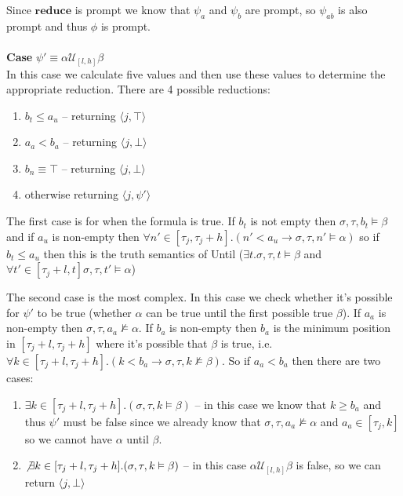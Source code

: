 \documentclass[10pt,a4paper]{article}
\newcommand{\rp}[2]{\ensuremath{\langle #1, #2 \rangle}}
\begin{document}
Since $\mathbf{reduce}$ is prompt we know that $\psi_a$ and $\psi_b$ are prompt, so $\psi_{ab}$ is also prompt and thus $\phi$ is prompt.
\\ \\ %
\noindent \textbf{Case} $\psi' \equiv \alpha \mathcal{U}_{[l,h]} \beta$ \\
In this case we calculate five values and then use these values to determine the appropriate reduction. There are 4 possible reductions:
\begin{enumerate}
\item $b_t \leq a_u$ -- returning $\rp{j}{\top}$
\item $a_a < b_a$ -- returning $\rp{j}{\bot}$
\item $b_n \equiv \top$ -- returning $\rp{j}{\bot}$
\item otherwise returning $\rp{j}{\psi'}$
\end{enumerate}

The first case is for when the formula is true. If $b_t$ is not empty then $\sigma, \tau, b_t \vDash \beta$ and 
if $a_u$ is non-empty then 
	$\forall n' \in [\tau_j,\tau_j+h].(n' < a_u \rightarrow \sigma, \tau, n' \vDash \alpha)$
	so if $b_t \leq a_u$ then this is the truth semantics of Until ($\exists t. \sigma, \tau, t \vDash \beta$ and $\forall t' \in [\tau_j+l,t] \sigma, \tau, t' \vDash \alpha$)

The second case is the most complex. In this case we check whether it's possible for $\psi'$ to be true (whether $\alpha$ can be true until the first possible true $\beta$).
If $a_a$ is non-empty then $\sigma, \tau, a_a \nvDash \alpha$. If $b_a$ is non-empty then $b_a$ is the minimum position in $[\tau_j+l,\tau_j+h]$ where it's possible that $\beta$ is true, i.e. $\forall k \in [\tau_j+l,\tau_j+h].(k < b_a \rightarrow \sigma, \tau, k \nvDash \beta)$.
So if $a_a < b_a$ then there are two cases: 
\begin{enumerate}
\item $\exists k \in [\tau_j+l,\tau_j+h].(\sigma,\tau,k \vDash \beta)$  -- in this case we know that $k \geq b_a$ and thus $\psi'$ must be false since we already know that $\sigma,\tau,a_a \nvDash \alpha$ and $a_a \in [\tau_j, k]$ so we cannot have $\alpha$ until $\beta$.
\item $\not\exists k \in [\tau_j+l,\tau_j+h].(\sigma,\tau,k \vDash \beta)$ -- in this case $\alpha \mathcal{U}_{[l,h]} \beta$ is false, so we can return $\rp{j}{\bot}$
\end{enumerate}
\end{document}
